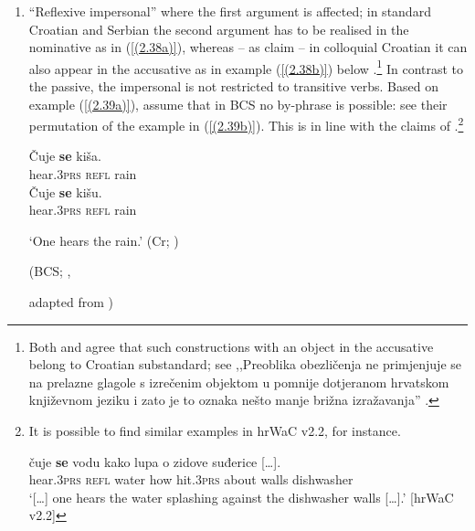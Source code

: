 \begin{enumerate}
\item ``Reflexive impersonal'' where the first argument is affected; in standard Croatian and Serbian the second argument has to be realised in the nominative as in (\ref{(2.38a)}), whereas – as \citet{FJL10} claim – in colloquial Croatian it can also appear in the accusative as in example (\ref{(2.38b)}) below \citep[cf.][146]{Katicic86}.\footnote{Both \citet[146]{Katicic86} and \citet[260]{BHMV99} agree that such constructions with an object in the accusative belong to Croatian substandard; see ,,Preoblika obezličenja ne primjenjuje se na prelazne glagole s izrečenim objektom u pomnije dotjeranom hrvatskom književnom jeziku i zato je to oznaka nešto manje brižna izražavanja'' \citep[146]{Katicic86}.} In contrast to the passive, the impersonal is not restricted to transitive verbs. Based on example (\ref{(2.39a)}), \citet[214]{FJL10} assume that in BCS no by-phrase is possible: see their permutation of the example in (\ref{(2.39b)}). This is in line with the claims of \citet[318]{SilicPranjkovic07}.\footnote{It is possible to find similar examples in hrWaC v2.2, for instance.

\ea\label{13102021}
\gll [\dots] čuje \textbf{se} vodu kako lupa o zidove {suđerice [\dots].}\\
 {} hear.\textsc{3prs} \textsc{refl} water how hit.\textsc{3prs} about walls dishwasher\\
\glt `[\dots] one hears the water splashing against the dishwasher walls [\dots].'
\hfill [hrWaC v2.2]
\z}

\begin{exe}\ex
\begin{xlist}
\ex\label{(2.38a)}
\gll Čuje \textbf{se} kiša.\\
 hear\textsc{.3prs} \textsc{refl} rain\\
\ex\label{(2.38b)}
\gll Čuje \textbf{se} kišu. \\
 hear\textsc{.3prs} \textsc{refl} rain\\
 \end{xlist}
\glt ‘One hears the rain.’ 
\hfill (Cr; \citealt[214]{FJL10})

\ex
\begin{xlist}
\strut\hfill (BCS; \citealt[223]{FJL10},\\\strut\hfill adapted from \citealt[72]{Progovac05})
\end{xlist}
\end{exe} 


\end{enumerate}

